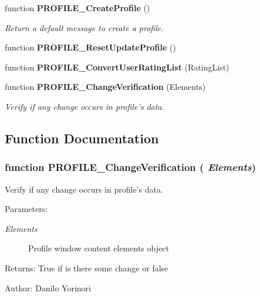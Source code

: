 \begin{CompactItemize}
function {\bf PROFILE\_\-CreateProfile} ()
\begin{CompactList}\small\item\em Return a default message to create a profile. \item\end{CompactList}\item 
function {\bf PROFILE\_\-ResetUpdateProfile} ()
\item 
function {\bf PROFILE\_\-ConvertUserRatingList} (RatingList)
\item 
function {\bf PROFILE\_\-ChangeVerification} (Elements)
\begin{CompactList}\small\item\em Verify if any change occurs in profile's data. \item\end{CompactList}\end{CompactItemize}


\subsection{Function Documentation}
\subsubsection[PROFILE\_\-ChangeVerification]{\setlength{\rightskip}{0pt plus 5cm}function PROFILE\_\-ChangeVerification ( {\em Elements})}\label{profile_2profile_8js_cc8df282a93d72c02437904d715aef6a}


Verify if any change occurs in profile's data. 

\begin{Desc}
\item[Parameters:]
\begin{description}
\item[{\em Elements}]Profile window content elements object \end{description}
\end{Desc}
\begin{Desc}
\item[Returns:]True if is there some change or false \end{Desc}
\begin{Desc}
\item[Author:]Danilo Yorinori \end{Desc}


